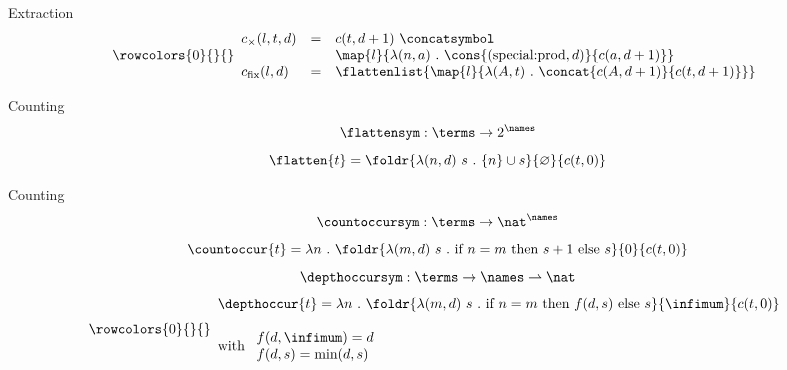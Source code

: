 \documentclass[department=ds, notes={hide notes}, slidesperpage=1]{beamerruhuisstijl}
\begin{document}
\begin{frame}{Extraction}
	$$
		\rowcolors{0}{}{}
		\begin{array}{lcl}
		c_{\times}(l, t, d) & = &
			c(t, d+1) ~\concatsymbol \\
			& & \map{l}{ \lambda (n, a) ~.~ \cons{(\text{special:prod}, d)}{c(a, d+1)}} \\
		c_{\text{fix}}(l, d) & = & \flattenlist{ \map{l}{ \lambda (A, t) ~.~ \concat{c(A, d+1)}{c(t, d+1)} } }
		\end{array}
	$$
\end{frame}


\begin{frame}{Counting}
	\[ \flattensym : \terms \rightarrow 2^{\names} \]
	\[ \flatten{t} = \foldr{\lambda (n, d)~s ~.~ \{n\} \cup s}{\varnothing}{c(t, 0)} \]
\end{frame}

\begin{frame}{Counting}
	\[ \countoccursym : \terms \rightarrow \nat^{\names} \]
	\[ \countoccur{t} = \lambda n ~.~ \foldr{\lambda (m, d)~s ~.~ \text{if~} n = m \text{~then~} s+1 \text{~else~} s}{0}{c(t, 0)} \]
	\bigskip
	\[ \depthoccursym : \terms \rightarrow \names \rightharpoonup \nat \]
	\[
		\rowcolors{0}{}{}
		\begin{array}{l}
		\depthoccur{t} = \lambda n ~.~ \foldr{\lambda (m, d)~s ~.~ \text{if~} n = m \text{~then~} f(d, s) \text{~else~} s}{\infimum}{c(t, 0)} \\
		\\
		\text{with~} \begin{array}{l}
			f(d, \infimum) = d \\
			f(d, s) = \text{min}(d, s) \\
		\end{array}
		\end{array}
	\]
\end{frame}
\end{document}
